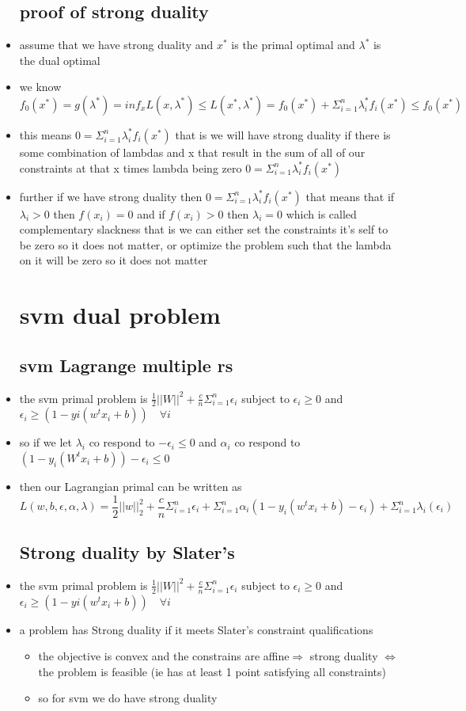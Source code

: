 \documentclass{article}
\begin{document}
\begin{itemize}
\subsection{proof of strong duality}
\item assume that we have strong duality and $x^{*}$ is the primal optimal and $\lambda^{*}$ is the dual optimal
\item we know $f_{0}(x^{*})=g(\lambda^{*})=inf_{x}L(x,\lambda^{*})\leq L(x^{*},\lambda^{*})=f_{0}(x^{*})+\Sigma_{i=1}^{n}\lambda_{i}^{*}f_{i}(x^{*})\leq f_{0}(x^{*})$
\item this means $0=\Sigma_{i=1}^{n}\lambda_{i}^{*}f_{i}(x^{*})$ that is we will have strong duality if there is some combination of lambdas and x that result in the sum of all of our constraints at that x times lambda being zero   $0=\Sigma_{i=1}^{n}\lambda_{i}^{*}f_{i}(x^{*})$ 
\item further if we have strong duality then $0=\Sigma_{i=1}^{n}\lambda_{i}^{*}f_{i}(x^{*})$ that means that if $\lambda_{i}>0 $ then $f(x_i)=0$ and if $f(x_i)>0$ then $\lambda_{i}=0$ which is called complementary slackness that is we can either set the constraints it's self to be zero so it does not matter, or optimize the problem such that the lambda on it will be zero so it does not matter
\section{svm dual problem}
\subsection{svm Lagrange multiple rs}
\item
 the svm primal problem is $\frac{1}{2}||W||^{2}+\frac{c}{n}\Sigma_{i=1}^{n}\epsilon_{i}$ subject to $\epsilon_{i}\geq 0$ and $\epsilon_{i}\geq (1-yi(w^{t}x_i+b))\quad \forall i$
 \item so if we let $\lambda_i$ co respond to $-\epsilon_{i}\leq 0$ and $\alpha_{i}$ co respond to 
$(1-y_{i}(W^{t}x_i+b))-\epsilon_{i}\leq 0$
\item then our Lagrangian primal can be written as $$L(w,b,\epsilon, \alpha, \lambda)=\frac{1}{2}||w||_{2}^{2}+\frac{c}{n}\Sigma_{i=1}^{n}\epsilon_i+\Sigma_{i=1}^{n}\alpha_{i}(1-y_i(w^{t}x_i+b)-\epsilon_{i})+\Sigma_{i=1}^{n}\lambda_{i}(\epsilon_{i})$$
\subsection{Strong duality by Slater's}
\item the svm primal problem is $\frac{1}{2}||W||^{2}+\frac{c}{n}\Sigma_{i=1}^{n}\epsilon_{i}$ subject to $\epsilon_{i}\geq 0$ and $\epsilon_{i}\geq (1-yi(w^{t}x_i+b))\quad \forall i$
\item a problem has Strong duality if it meets Slater's constraint qualifications 
\begin{itemize}
    \item the objective is convex and the constrains are affine$ \Rightarrow$ strong duality $\iff$ the problem is feasible (ie has at least 1 point satisfying all constraints)
    \item so for svm we do have strong duality 
\end{itemize}

\end{itemize}
\end{document}
